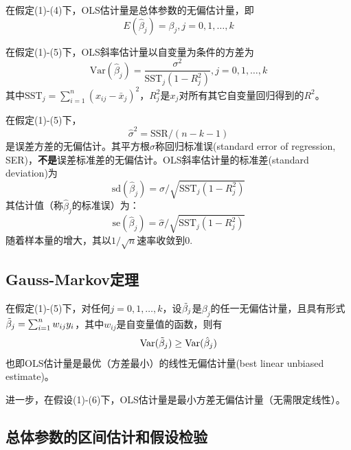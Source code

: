 \par 在假定(1)-(4)下，OLS估计量是总体参数的无偏估计量，即
\begin{equation}
    E(\hat{\beta}_j)=\beta_j, j=0,1,\dots,k
\end{equation}
\par 在假定(1)-(5)下，OLS斜率估计量以自变量为条件的方差为
\begin{equation}
    \text{Var}(\hat{\beta}_j)=\frac{\sigma^2}{\text{SST}_j (1-R_j^2)}, j=0,1,\dots,k \label{eq:Variance}
\end{equation}
其中$\text{SST}_j=\sum_{i=1}^n (x_{ij}-\bar{x}_j)^2$，$R_j^2$是$x_j$对所有其它自变量回归得到的$R^2$。
\par 在假定(1)-(5)下，
\begin{equation}
    \hat{\sigma}^2=\text{SSR}/(n-k-1)
\end{equation}
是误差方差的无偏估计。其平方根$\hat{\sigma}$称回归标准误(standard error of regression, SER)，\textbf{不是}误差标准差的无偏估计。OLS斜率估计量的标准差(standard deviation)为
\begin{equation}
    \text{sd}(\hat{\beta}_j)=\sigma/\sqrt{\text{SST}_j(1-R_j^2)}
\end{equation}
其估计值（称$\hat{\beta}_j$的标准误）为：
\begin{equation}
    \text{se}(\hat{\beta}_j)=\hat{\sigma}/\sqrt{\text{SST}_j(1-R_j^2)}
\end{equation}
随着样本量的增大，其以$1/\sqrt{n}$速率收敛到0. 

\subsection{Gauss-Markov定理}

\par 在假定(1)-(5)下，对任何$j=0,1,\dots,k$，设$\Tilde{\beta}_j$是$\beta_j$的任一无偏估计量，且具有形式$\Tilde{\beta}_j=\sum_{i=1}^n w_{ij}y_i$，其中$w_{ij}$是自变量值的函数，则有
\begin{equation}
    \text{Var}(\Tilde{\beta}_j)\ge \text{Var}(\hat{\beta}_j)
\end{equation}
也即OLS估计量是最优（方差最小）的线性无偏估计量(best linear unbiased estimate)。
\par 进一步，在假设(1)-(6)下，OLS估计量是最小方差无偏估计量（无需限定线性）。


\subsection{总体参数的区间估计和假设检验}


